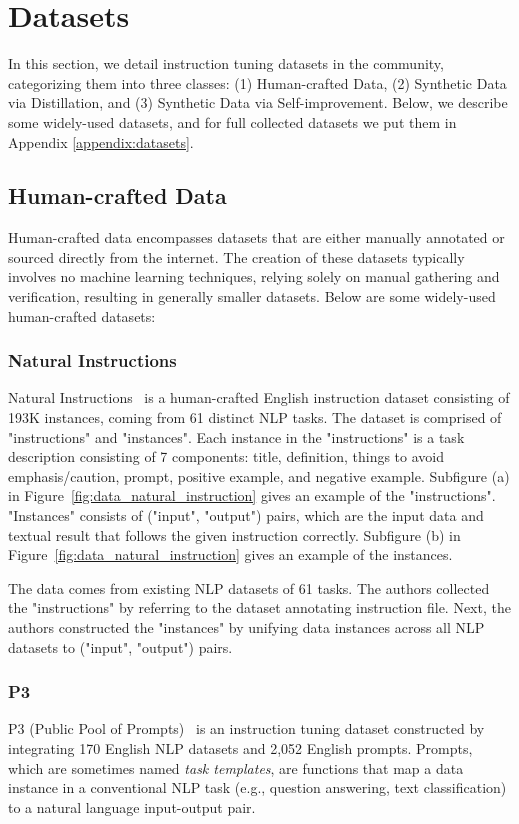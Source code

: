 \documentclass[11pt]{article}
\begin{document}
\section{Datasets}  
\label{sec:Datasets}
In this section, we detail instruction tuning datasets in the community, categorizing them into three classes: (1) Human-crafted Data, (2) Synthetic Data via Distillation, and (3) Synthetic Data via Self-improvement. Below, we describe some widely-used datasets, and for full collected datasets we put them in Appendix \ref{appendix:datasets}.

\subsection{Human-crafted Data}

Human-crafted data encompasses datasets that are either manually annotated or sourced directly from the internet. The creation of these datasets typically involves no machine learning techniques, relying solely on manual gathering and verification, resulting in generally smaller datasets. Below are some widely-used human-crafted datasets:

\subsubsection{Natural Instructions}

Natural Instructions~\citep{mishra2021cross} is a human-crafted English instruction dataset consisting of 193K  instances, coming from 61 distinct NLP tasks. 
The dataset is comprised of "instructions" and "instances". Each instance in the "instructions" is a task description consisting of 7 components: title, definition, things to avoid emphasis/caution, prompt, positive example, and negative example. Subfigure (a) in Figure~\ref{fig:data_natural_instruction}  gives an example of the "instructions". 
"Instances" consists of ("input", "output") pairs, which are the input data and textual result that follows the given instruction correctly. 
Subfigure (b) in Figure~\ref{fig:data_natural_instruction} gives an example of the instances. 

The  data  comes from existing NLP datasets of 61 tasks. The authors collected the "instructions" by  referring to the dataset annotating instruction file. Next, the authors constructed the "instances" by unifying data instances across all NLP datasets to ("input", "output") pairs. 

\subsubsection{P3}
P3 (Public Pool of Prompts)~\citep{sanh2021multitask} is an instruction tuning dataset constructed by integrating 170 English NLP datasets and 2,052 English prompts. Prompts, which are sometimes named \textit{task templates}, are functions that map a data instance in a conventional NLP task (e.g., question answering, text classification) to a natural language input-output pair.
\end{document}
